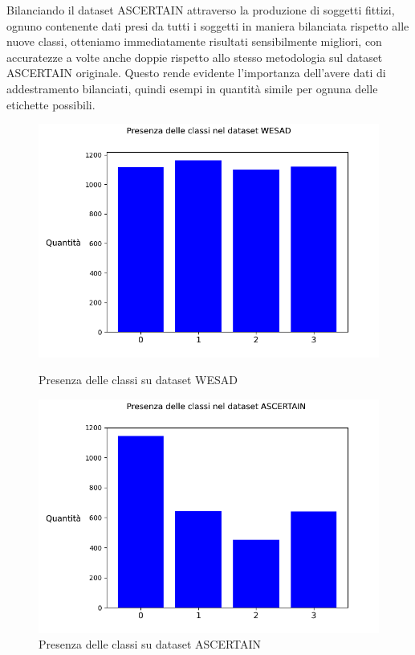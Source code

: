 Bilanciando il dataset ASCERTAIN attraverso la produzione di soggetti fittizi, ognuno contenente dati presi da tutti i soggetti in maniera bilanciata rispetto alle nuove classi, otteniamo immediatamente risultati sensibilmente migliori, con accuratezze a volte anche doppie rispetto allo stesso metodologia sul dataset ASCERTAIN originale. Questo rende evidente l'importanza dell'avere dati di addestramento bilanciati, quindi esempi in quantità simile per ognuna delle etichette possibili.
\begin{figure}[h]
    \begin{minipage}[b]{0.5\textwidth}
		\includegraphics[width=\textwidth]{img/graphs/wesad_dataset.png}
		\caption{Presenza delle classi su dataset WESAD}
		\label{fig:wesadclasses}
	\end{minipage}
    \hfill
    \begin{minipage}[b]{0.5\textwidth}
		\includegraphics[width=\textwidth]{img/graphs/ascertain_dataset.png}
		\caption{Presenza delle classi su dataset ASCERTAIN}
		\label{fig:ascertainclasses}
	\end{minipage}
\end{figure}

